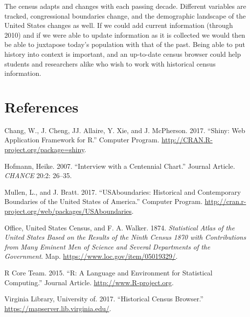 \documentclass[11pt,]{article}
\begin{document}
The census adapts and changes with each passing decade. Different
variables are tracked, congressional boundaries change, and the
demographic landscape of the United States changes as well. If we could
add current information (through 2010) and if we were able to update
information as it is collected we would then be able to juxtapose
today's population with that of the past. Being able to put history into
context is important, and an up-to-date census browser could help
students and researchers alike who wish to work with historical census
information.

\section{References}

\hypertarget{refs}{}
\hypertarget{ref-Shiny}{}
Chang, W., J. Cheng, JJ. Allaire, Y. Xie, and J. McPherson. 2017.
``Shiny: Web Application Framework for R.'' Computer Program.
\url{http://CRAN.R-project.org/package=shiny}.

\hypertarget{ref-ChartInterview}{}
Hofmann, Heike. 2007. ``Interview with a Centennial Chart.'' Journal
Article. \emph{CHANCE} 20:2: 26--35.

\hypertarget{ref-USAboundaries}{}
Mullen, L., and J. Bratt. 2017. ``USAboundaries: Historical and
Contemporary Boundaries of the United States of America.'' Computer
Program. \url{http://cran.r-project.org/web/packages/USAboundaries}.

\hypertarget{ref-StatisticalAtlas}{}
Office, United States Census, and F. A. Walker. 1874. \emph{Statistical
Atlas of the United States Based on the Results of the Ninth Census 1870
with Contributions from Many Eminent Men of Science and Several
Departments of the Government}. Map.
\url{https://www.loc.gov/item/05019329/}.

\hypertarget{ref-RCoreTeam}{}
R Core Team. 2015. ``R: A Language and Environment for Statistical
Computing.'' Journal Article. \url{http://www.R-project.org}.

\hypertarget{ref-HCB}{}
Virginia Library, University of. 2017. ``Historical Census Browser.''
\url{https://mapserver.lib.virginia.edu/}.
\end{document}
